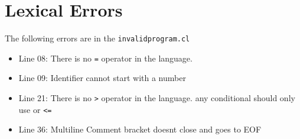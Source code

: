 \documentclass[12pt,a4paper]{article}
\begin{document}
\pagebreak

\section{Lexical Errors}
The following errors are in the \texttt{invalidprogram.cl}
\begin{itemize}
    \item Line 08: There is no \texttt{=} operator in the language.
    \item Line 09: Identifier cannot start with a number

    \item Line 21: There is no \texttt{>} operator in the language. any conditional should only use \texxttt{<} or \texttt{<=} 
    \item Line 36: Multiline Comment bracket doesnt close and goes to EOF 
\end{itemize}
\end{document}
